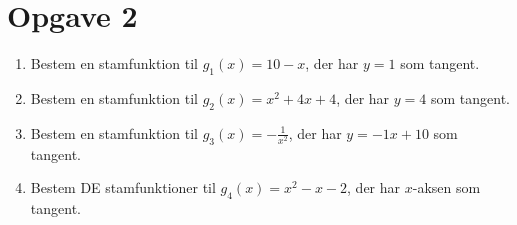 \section*{Opgave 2}
\begin{enumerate}[label=\roman*)]
\item Bestem en stamfunktion til $g_1(x) = 10-x$, der har $y=1$ som tangent.
\item Bestem en stamfunktion til $g_2(x) = x^2+4x+4$, der har  $y=4$ som tangent.
\item Bestem en stamfunktion til $g_3(x) = -\frac{1}{x^2}$, der har $y = -1x+10$ som tangent.
\item Bestem DE stamfunktioner til $g_4(x) = x^2-x-2$, der har $x$-aksen som tangent.
\end{enumerate}